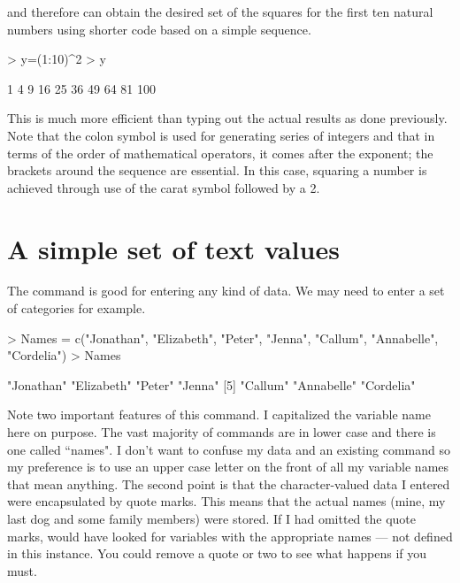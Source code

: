 and therefore can obtain the desired set of the squares for the first ten natural numbers using shorter code based on a simple sequence. 

\begin{Schunk}
\begin{Sinput}
> y=(1:10)^2 
> y 
\end{Sinput}
\begin{Soutput}
 [1]   1   4   9  16  25  36  49  64  81 100
\end{Soutput}
\end{Schunk}

This is much more efficient than typing out the actual results as done previously. Note that the colon symbol is used for generating series of integers and that in terms of the order of mathematical operators, it comes after the exponent; the brackets around the sequence are essential. In this case, squaring a number is achieved through use of the carat symbol followed by a 2.  
 
 
\section{A simple set of text values} 
 
The  command is good for entering any kind of data. We may need to enter a set of categories for example. 

\begin{Schunk}
\begin{Sinput}
> Names = c("Jonathan", "Elizabeth", "Peter", "Jenna", "Callum", "Annabelle", "Cordelia") 
> Names 
\end{Sinput}
\begin{Soutput}
[1] "Jonathan"  "Elizabeth" "Peter"     "Jenna"    
[5] "Callum"    "Annabelle" "Cordelia" 
\end{Soutput}
\end{Schunk}

Note two important features of this command. I capitalized the variable name here on purpose. The vast majority of \R{} commands are in lower case and there is one called ``names". I don't want to confuse my data and an existing \R{} command so my preference is to use an upper case letter on the front of all my variable names that mean anything. The second point is that the character-valued data I entered were encapsulated by quote marks. This means that the actual names (mine, my last dog and some family members) were stored. If I had omitted the quote marks, \R{} would have looked for variables with the appropriate names --- not defined in this instance. You could remove a quote or two to see what happens if you must. 
 
